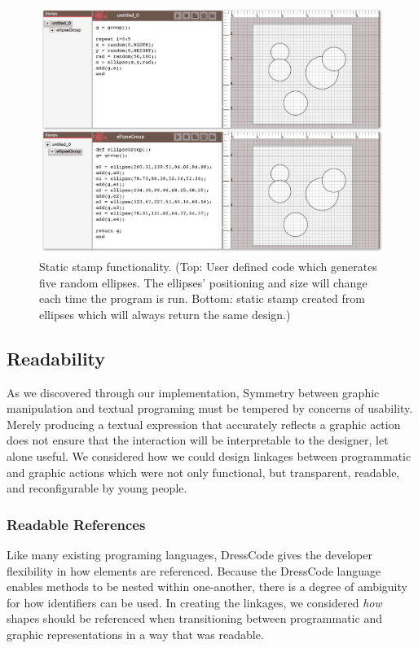 \documentclass{sigchi}
\begin{document}
\begin{center}
\begin{figure}[h!]
\includegraphics[width=\columnwidth]{images/stamps.jpg}
\caption{Static stamp functionality. (Top: User defined code which generates five random ellipses. The ellipses' positioning and size will change each time the program is run. Bottom: static stamp created from ellipses which will always return the same design.)}
\label{fig:stamps}
\end{figure}
\end{center}
\vspace{-20pt}

\subsection{Readability}
\label{subsec:readability}
As we discovered through our implementation, Symmetry between graphic manipulation and textual programing must be tempered by concerns of usability. Merely producing a textual expression that accurately reflects a graphic action does not ensure that the interaction will be interpretable to the designer, let alone useful. We considered how we could design linkages between programmatic and graphic actions which were not only functional, but transparent, readable, and reconfigurable by young people. 

\subsubsection{Readable References}
Like many existing programing languages, DressCode gives the developer flexibility in how elements are referenced. Because the DressCode language enables methods to be nested within one-another, there is a degree of ambiguity for how identifiers can be used. In creating the linkages, we considered \textit{how} shapes should be referenced when transitioning between programmatic and graphic representations in a way that was readable. 
\end{document}
